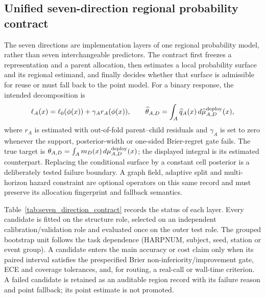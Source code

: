 \documentclass[11pt,a4paper]{article}
\numberwithin{equation}{section}
\theoremstyle{definition}\newtheorem{definition}[theorem]{Definition}
\theoremstyle{remark}\newtheorem{remark}[theorem]{Remark}
\begin{document}
\subsection{Unified seven-direction regional probability contract}
\label{sec:seven_direction_contract}

The seven directions are implementation layers of one regional probability model, rather than seven interchangeable predictors. The contract first freezes a representation and a parent allocation, then estimates a local probability surface and its regional estimand, and finally decides whether that surface is admissible for reuse or must fall back to the point model. For a binary response, the intended decomposition is
\[
\ell_A(x)=\ell_0(\phi(x))+\gamma_A r_A(\phi(x)),\qquad
\widehat\theta_{A,D}=\int_A\widehat q_A(x)\,d\widehat\mu_{A,D}^{\rm deploy}(x),
\]
where $r_A$ is estimated with out-of-fold parent--child residuals and $\gamma_A$ is set to zero whenever the support, posterior-width or one-sided Brier-regret gate fails. The true target is $\theta_{A,D}=\int_A m_D(x)\,d\mu_{A,D}^{\rm deploy}(x)$; the displayed integral is its estimated counterpart. Replacing the conditional surface by a constant cell posterior is a deliberately tested failure boundary. A graph field, adaptive split and multi-horizon hazard constraint are optional operators on this same record and must preserve its allocation fingerprint and fallback semantics.

Table~\ref{tab:seven_direction_contract} records the status of each layer. Every candidate is fitted on the structure role, selected on an independent calibration/validation role and evaluated once on the outer test role. The grouped bootstrap unit follows the task dependence (HARPNUM, subject, seed, station or event group). A candidate enters the main accuracy or cost claim only when its paired interval satisfies the prespecified Brier non-inferiority/improvement gate, ECE and coverage tolerances, and, for routing, a real-call or wall-time criterion. A failed candidate is retained as an auditable region record with its failure reason and point fallback; its point estimate is not promoted.
\end{document}
